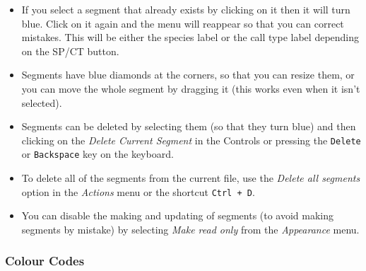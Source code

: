 \documentclass{scrartcl}
\begin{document}
\begin{itemize}
	\item If you select a segment that already exists by clicking on it then it will turn blue.
		Click on it again and the menu will reappear so that you can correct mistakes.
		This will be either the species label or the call type label depending on the SP/CT button.
	\item Segments have blue diamonds at the corners, so that you can resize them, or you can move the whole segment by dragging it (this works even when it isn't selected). 
	\item Segments can be deleted by selecting them (so that they turn blue) and then clicking on the \textit{Delete Current Segment} in the Controls or pressing the \texttt{Delete} or \texttt{Backspace} key on the keyboard. 
	\item To delete all of the segments from the current file, use the \textit{Delete all segments} option in the \textit{Actions} menu or the shortcut \texttt{Ctrl + D}. 
	\item You can disable the making and updating of segments (to avoid making segments by mistake) by selecting \textit{Make read only} from the \textit{Appearance} menu.
\end{itemize}


\subsubsection*{Colour Codes}\label{sec:ColourCodes}
\end{document}
